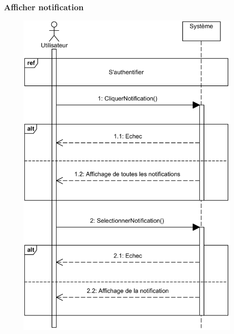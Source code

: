 \pagebreak
    \subsubsection[Afficher notification]{Afficher notification}
        \begin{figure}[H]
            \centering
            \includegraphics[width=130mm]{images/sd-notification.png}
            \label{fig:sdAffNotification}
        \end{figure}
\pagebreak
